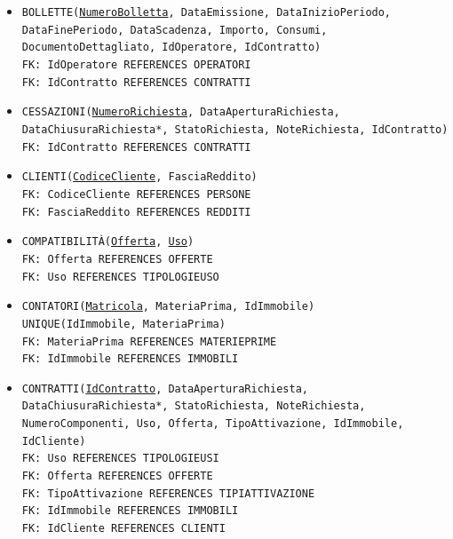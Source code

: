 \documentclass[a4paper,12pt]{report}
\begin{document}
\begin{itemize}
    \item \texttt{BOLLETTE(\underline{NumeroBolletta}, DataEmissione, DataInizioPeriodo, DataFinePeriodo, DataScadenza, Importo, Consumi, DocumentoDettagliato, IdOperatore, IdContratto) \\
    FK: IdOperatore REFERENCES OPERATORI \\
    FK: IdContratto REFERENCES CONTRATTI}
    
    \item \texttt{CESSAZIONI(\underline{NumeroRichiesta}, DataAperturaRichiesta, DataChiusuraRichiesta*, StatoRichiesta, NoteRichiesta, IdContratto) \\
    FK: IdContratto REFERENCES CONTRATTI}
    
    \item \texttt{CLIENTI(\underline{CodiceCliente}, FasciaReddito) \\
    FK: CodiceCliente REFERENCES PERSONE \\
    FK: FasciaReddito REFERENCES REDDITI}
    
    \item \texttt{COMPATIBILITÀ(\underline{Offerta}, \underline{Uso}) \\
    FK: Offerta REFERENCES OFFERTE \\
    FK: Uso REFERENCES TIPOLOGIE\textunderscore USO
    }
    
    \item \texttt{CONTATORI(\underline{Matricola}, MateriaPrima, IdImmobile) \\
    UNIQUE(IdImmobile, MateriaPrima) \\
    FK: MateriaPrima REFERENCES MATERIE\textunderscore PRIME \\
    FK: IdImmobile REFERENCES IMMOBILI}
    
    \item \texttt{CONTRATTI(\underline{IdContratto}, DataAperturaRichiesta, DataChiusuraRichiesta*, StatoRichiesta, NoteRichiesta, NumeroComponenti, Uso, Offerta, TipoAttivazione, IdImmobile, IdCliente) \\
    FK: Uso REFERENCES TIPOLOGIE\textunderscore USI \\
    FK: Offerta REFERENCES OFFERTE \\
    FK: TipoAttivazione REFERENCES TIPI\textunderscore ATTIVAZIONE \\
    FK: IdImmobile REFERENCES IMMOBILI \\
    FK: IdCliente REFERENCES CLIENTI
    }
    

\end{itemize}
\end{document}
